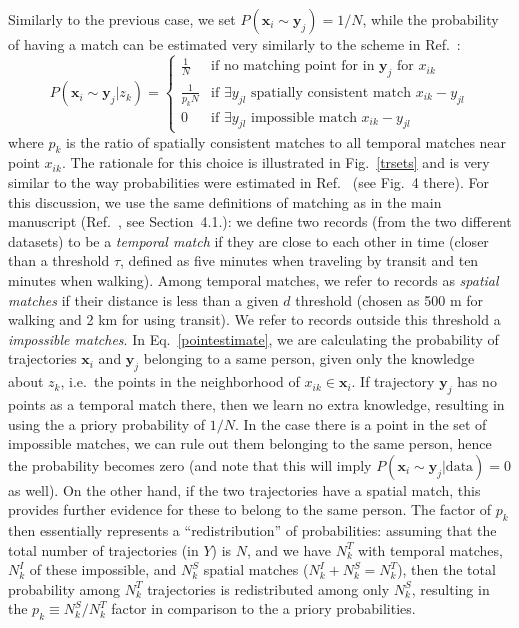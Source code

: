 \documentclass[a4paper]{article}
\renewcommand{\vec}[1]{\mathbf{#1}}
\begin{document}
		Similarly to the previous case, we set $P( \vec{x}_i \sim \vec{y}_j) = 1 / N$, while the probability of having a match can be estimated very
		similarly to the scheme in Ref.~\cite{Juhasz}:
		\begin{equation}
			P( \vec{x}_i \sim \vec{y}_j | z_k ) = \begin{cases}
				\frac{1}{N} & \textrm{if no matching point for in } \vec{y}_j \textrm{ for } x_{ik} \\
				\frac{1}{p_k N} & \textrm{if } \exists y_{jl} \textrm{ spatially consistent match } x_{ik} - y_{jl} \\
				0 & \textrm{if } \exists y_{jl} \textrm{ impossible match } x_{ik} - y_{jl}
			\end{cases}
			\label{pointestimate}
		\end{equation}
		where $p_k$ is the ratio of spatially consistent matches to all temporal matches near point $x_{ik}$. The rationale for this choice is
		illustrated in Fig.~\ref{trsets} and is very similar to the way probabilities were estimated in Ref.~\cite{Juhasz} (see Fig.~4 there). For
		this discussion, we use the same definitions of matching as in the main manuscript (Ref.~\cite{matchingpaper}, see Section~4.1.): we define
		two records (from the two different datasets) to be a \emph{temporal match} if they are close to each other in time (closer than a threshold
		$\tau$, defined as five minutes when traveling by transit and ten minutes when walking). Among temporal matches, we refer to records as
		\emph{spatial matches} if their distance is less than a given $d$ threshold (chosen as 500 m for walking and 2 km for using transit). We refer
		to records outside this threshold a \emph{impossible matches}. In Eq.~\ref{pointestimate}, we are calculating the probability of trajectories
		$\vec{x}_i$ and $\vec{y}_j$ belonging to a same person, given only the knowledge about $z_k$, i.e.~the points in the neighborhood of
		$x_{ik} \in \vec{x}_i$. If trajectory $\vec{y}_j$ has no points as a temporal match there, then we learn no extra knowledge, resulting in
		using the a priory probability of $1/N$. In the case there is a point in the set of impossible matches, we can rule out them belonging to the
		same person, hence the probability becomes zero (and note that this will imply $P( \vec{x}_i \sim \vec{y}_j | \textrm{data} ) = 0$ as well).
		On the other hand, if the two trajectories have a spatial match, this provides further evidence for these to belong to the same person. The
		factor of $p_k$ then essentially represents a ``redistribution'' of probabilities: assuming that the total number of trajectories (in $Y$) is
		$N$, and we have $N^T_k$ with temporal matches, $N^I_k$ of these impossible, and $N^S_k$ spatial matches ($N^I_k + N^S_k = N^T_k$), then the
		total probability among $N^T_k$ trajectories is redistributed among only $N^S_k$, resulting in the $p_k \equiv N^S_k / N^T_k$ factor in
		comparison to the a priory probabilities.
		
\end{document}
